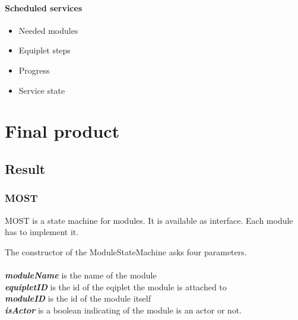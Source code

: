 \documentclass[12pt,a4paper]{report}
\begin{document}
\subsubsection{Scheduled services}
\begin{itemize}
\item Needed modules
\item Equiplet steps
\item Progress
\item Service state
\end{itemize}

\chapter{Final product}
\section{Result}
\subsection{MOST}

\begin{figure}
\end{figure}

MOST is a state machine for modules.
It is available as interface.
Each module has to implement it. 

The constructor of the ModuleStateMachine asks four parameters. \\
\\
\textbf{\textit{moduleName}} is the name of the module \\
\textbf{\textit{equipletID}} is the id of the eqiplet the module is attached to \\
\textbf{\textit{moduleID}} is the id of the module itself \\
\textbf{\textit{isActor}} is a boolean indicating of the module is an actor or not. \\
\end{document}
